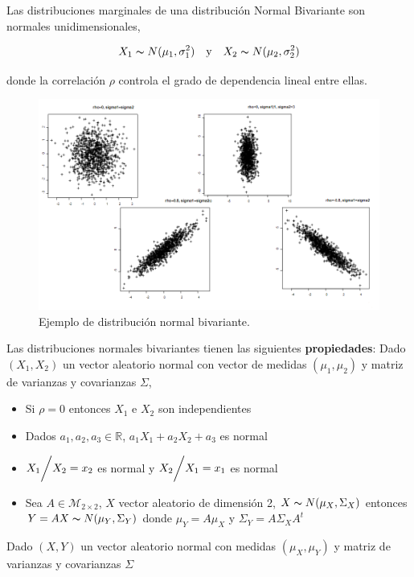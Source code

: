 \documentclass{article}
\begin{document}
Las distribuciones marginales de una distribución Normal Bivariante son normales unidimensionales,

\[ X_1\thicksim N(\mu_1,\sigma_1^2) \quad \text{y} \quad X_2\thicksim N(\mu_2,\sigma_2^2) \]

donde la correlación $\rho$ controla el grado de dependencia lineal entre ellas.

\newpage

\begin{figure}[htbp]
    \center
    \includegraphics[scale=0.5]{img/GraficosNormalBivariable.png}
\caption{Ejemplo de distribución normal bivariante.}
\end{figure}

Las distribuciones normales bivariantes tienen las siguientes \textbf{propiedades}:
Dado $(X_1,X_2)$ un vector aleatorio normal con vector de medidas $(\mu_1,\mu_2)$ y matriz de varianzas y covarianzas $\Sigma$,
\begin{itemize}
    \item Si $\rho = 0$ entonces $X_1$ e $X_2$ son independientes
    \item Dados $a_1,a_2,a_3 \in \mathbb{R}$, $a_1X_1 + a_2X_2 + a_3$ es normal
    \item $X_1 \bigg{/} X_2 = x_2$ es normal y $X_2 \bigg{/} X_1 = x_1$ es normal
    \item Sea $A \in \mathcal{M}_{2\times2}$, $X$ vector aleatorio de dimensión 2, $X\thicksim N(\mu_X, \Sigma_X)$ entonces \\ $Y=AX\thicksim N(\mu_Y, \Sigma_Y)$ donde $\mu_Y = A\mu_X$ y $\Sigma_Y = A\Sigma_XA^t$
\end{itemize}

Dado $(X, Y)$ un vector aleatorio normal con medidas $(\mu_X, \mu_Y)$ y matriz de varianzas y covarianzas $\Sigma$
\end{document}
